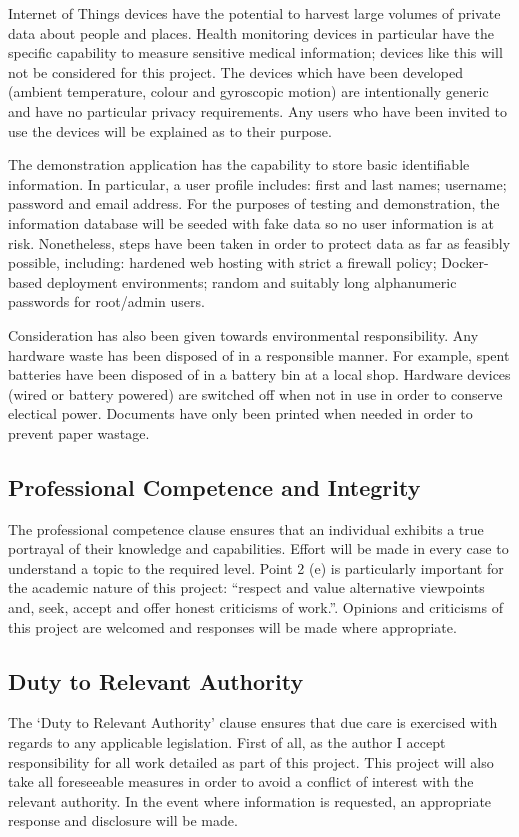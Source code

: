       Internet of Things devices have the potential to harvest large volumes of private data about people and places. Health monitoring devices in particular have the specific capability to measure sensitive medical information; devices like this will not be considered for this project. The devices which have been developed (ambient temperature, colour and gyroscopic motion) are intentionally generic and have no particular privacy requirements. Any users who have been invited to use the devices will be explained as to their purpose.

      The demonstration application has the capability to store basic identifiable information. In particular, a user profile includes: first and last names; username; password and email address. For the purposes of testing and demonstration, the information database will be seeded with fake data so no user information is at risk. Nonetheless, steps have been taken in order to protect data as far as feasibly possible, including: hardened web hosting with strict a firewall policy; Docker-based deployment environments; random and suitably long alphanumeric passwords for root/admin users.

      Consideration has also been given towards environmental responsibility. Any hardware waste has been disposed of in a responsible manner. For example, spent batteries have been disposed of in a battery bin at a local shop. Hardware devices (wired or battery powered) are switched off when not in use in order to conserve electical power. Documents have only been printed when needed in order to prevent paper wastage. 

    \subsection{Professional Competence and Integrity}
      The professional competence clause ensures that an individual exhibits a true portrayal of their knowledge and capabilities. Effort will be made in every case to understand a topic to the required level. Point 2 (e) is particularly important for the academic nature of this project: ``respect and value alternative viewpoints and, seek, accept and offer honest criticisms of work.''. Opinions and criticisms of this project are welcomed and responses will be made where appropriate. 

    \subsection{Duty to Relevant Authority}
      The `Duty to Relevant Authority' clause ensures that due care is exercised with regards to any applicable legislation. First of all, as the author I accept responsibility for all work detailed as part of this project. This project will also take all foreseeable measures in order to avoid a conflict of interest with the relevant authority. In the event where information is requested, an appropriate response and disclosure will be made.

